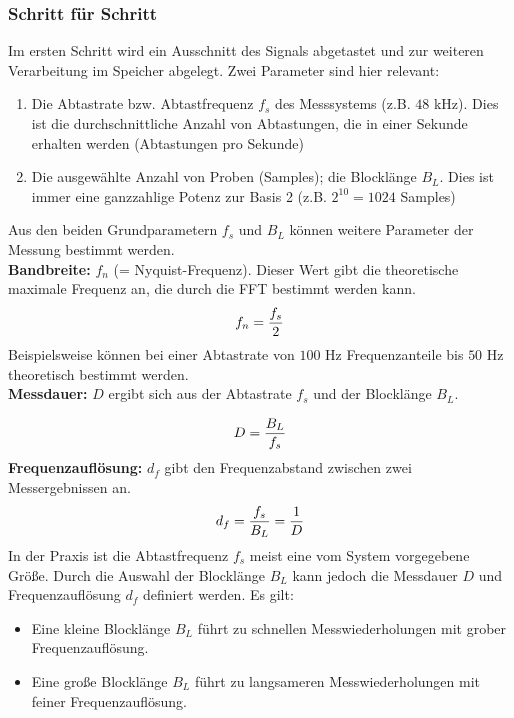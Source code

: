 \subsubsection{Schritt für Schritt}
Im ersten Schritt wird ein Ausschnitt des Signals abgetastet und zur weiteren Verarbeitung im Speicher abgelegt. Zwei Parameter sind hier relevant:
\begin{enumerate}
	\item Die Abtastrate bzw. Abtastfrequenz $f_s$ des Messsystems (z.B. $48$ kHz). Dies ist die durchschnittliche Anzahl von Abtastungen, die in einer Sekunde erhalten werden (Abtastungen pro Sekunde)
	\item Die ausgewählte Anzahl von Proben (Samples); die Blocklänge $B_L$. Dies ist immer eine ganzzahlige Potenz zur Basis 2 (z.B. $2^{10}=1024$ Samples)
\end{enumerate}
Aus den beiden Grundparametern $f_s$ und $B_L$ können weitere Parameter der Messung bestimmt werden. \\
\textbf{Bandbreite:}  $f_n$ (= Nyquist-Frequenz). Dieser Wert gibt die theoretische maximale Frequenz an, die durch die FFT bestimmt werden kann.
\begin{align}
	\centering
	f_n = \frac{f_s}{2}
	\label{gl:Nyquist-Frequenz}
\end{align}
Beispielsweise können bei einer Abtastrate von $100$ Hz Frequenzanteile bis $50$ Hz theoretisch bestimmt werden.\\
\textbf{Messdauer:} $D$ ergibt sich aus der Abtastrate $f_s$ und der Blocklänge $B_L$.

\begin{align}
	\centering
	D = \frac{B_L}{f_s}
	\label{gl:Messdauer}
\end{align}
\textbf{Frequenzauflösung:} $d_f$ gibt den Frequenzabstand zwischen zwei Messergebnissen an.
\begin{align}
	\centering
	d_f = \frac{f_s}{B_L} = \frac{1}{D}
	\label{gl:Frequenzaufloesung}
\end{align}
In der Praxis ist die Abtastfrequenz $f_s$ meist eine vom System vorgegebene Größe. Durch die Auswahl der Blocklänge $B_L$ kann jedoch die Messdauer $D$ und Frequenzauflösung $d_f$ definiert werden. Es gilt:\\
\begin{itemize}
	\item Eine kleine Blocklänge $B_L$ führt zu schnellen Messwiederholungen mit grober Frequenzauflösung.
	\item Eine große Blocklänge $B_L$ führt zu langsameren Messwiederholungen mit feiner Frequenzauflösung.
\end{itemize}
